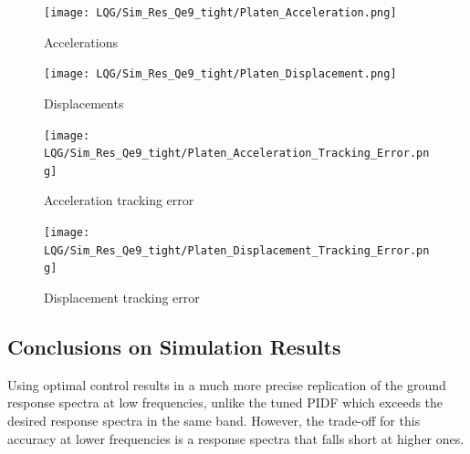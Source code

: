 \documentclass[9pt]{extarticle}
\begin{document}
\begin{figure}[H]
\begin{minipage}{0.49\textwidth}
    \centering
    \texttt{[image: LQG/Sim\_Res\_Qe9\_tight/Platen\_Acceleration.png]}
    \caption{Accelerations}
    \label{fig_Platen_Acceleration_LQG_Qe9}
\end{minipage}
\hfill
\begin{minipage}{0.49\textwidth}
    \centering
    \texttt{[image: LQG/Sim\_Res\_Qe9\_tight/Platen\_Displacement.png]}
    \caption{Displacements}
    \label{fig_Platen_Displacement_LQG_Qe9}
\end{minipage}
\end{figure}


\begin{figure}[H]
\begin{minipage}{0.49\textwidth}
    \centering
    \texttt{[image: LQG/Sim\_Res\_Qe9\_tight/Platen\_Acceleration\_Tracking\_Error.png]}
    \caption{Acceleration tracking error}
    \label{fig_Platen_Acceleration_Tracking_Error_LQG_Qe9}
\end{minipage}
\hfill
\begin{minipage}{0.49\textwidth}
    \centering
    \texttt{[image: LQG/Sim\_Res\_Qe9\_tight/Platen\_Displacement\_Tracking\_Error.png]}
    \caption{Displacement tracking error}
    \label{fig_Platen_Displacement_Tracking_Error_LQG_Qe9}
\end{minipage}
\end{figure}


\subsection{Conclusions on Simulation Results}
Using optimal control results in a much more precise replication of the ground response spectra at low frequencies, unlike the tuned PIDF which exceeds the desired response spectra in the same band. However, the trade-off for this accuracy at lower frequencies is a response spectra that falls short at higher ones. 
\end{document}

